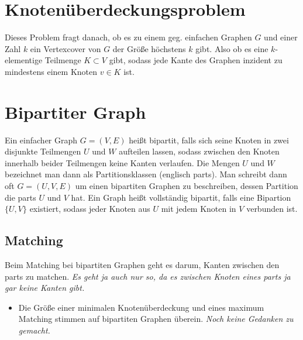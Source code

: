 \documentclass[paper=a4,10pt]{scrartcl}
\begin{document}
\section{Knotenüberdeckungsproblem}
Dieses Problem fragt danach, ob es zu einem geg. einfachen Graphen $G$ und einer Zahl $k$ ein Vertexcover von $G$ der Größe höchstens $k$ gibt. Also ob es eine $k$-elementige Teilmenge $K \subset V$ gibt, sodass jede Kante des Graphen inzident zu mindestens einem Knoten $v \in K$ ist.

\section{Bipartiter Graph}
Ein einfacher Graph $G=(V,E)$ heißt bipartit, falls sich seine Knoten in zwei disjunkte Teilmengen $U$ und $W$ aufteilen lassen, sodass zwischen den Knoten innerhalb beider Teilmengen keine Kanten verlaufen. Die Mengen $U$ und $W$ bezeichnet man dann als Partitionsklassen (englisch parts). Man schreibt dann oft $G = (U, V, E)$ um einen bipartiten Graphen zu beschreiben, dessen Partition die parts $U$ und $V$ hat.
Ein Graph heißt vollständig bipartit, falls eine Bipartion $\{ U, V\}$ existiert, sodass jeder Knoten aus $U$ mit jedem Knoten in $V$ verbunden ist.

\subsection{Matching}
Beim Matching bei bipartiten Graphen geht es darum, Kanten zwischen den parts zu matchen. \textit{Es geht ja auch nur so, da es zwischen Knoten eines parts ja gar keine Kanten gibt.}

\begin{itemize}
\item Die Größe einer minimalen Knotenüberdeckung und eines maximum Matching stimmen auf bipartiten Graphen überein. \textit{Noch keine Gedanken zu gemacht.}


\end{itemize}
\end{document}

